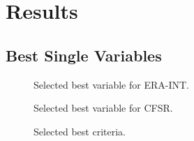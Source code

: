 \documentclass[draft]{agujournal2019}
\begin{document}
\section{Results}
\label{results}

\subsection{Best Single Variables}
\label{best_single}



\begin{figure}[hbt]
	\noindent{}
	\caption{Selected best variable for ERA-INT.}
	\label{fig_best_era_int}
\end{figure}

\begin{figure}[hbt]
	\noindent{}
	\caption{Selected best variable for CFSR.}
	\label{fig_best_cfsr}
\end{figure}

\begin{figure}[hbt]
	\noindent{}
	\caption{Selected best criteria.}
	\label{fig_criteria}
\end{figure}
\end{document}
